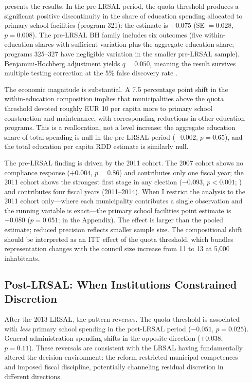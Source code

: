 \documentclass[12pt]{article}
\begin{document}
 presents the results. In the pre-LRSAL period, the quota threshold produces a significant positive discontinuity in the share of education spending allocated to primary school facilities (program 321): the estimate is $+0.075$ (SE $= 0.028$, $p = 0.008$). The pre-LRSAL BH family includes six outcomes (five within-education shares with sufficient variation plus the aggregate education share; programs 325--327 have negligible variation in the smaller pre-LRSAL sample). Benjamini-Hochberg adjustment yields $q = 0.050$, meaning the result survives multiple testing correction at the 5\% false discovery rate \citep{benjamini1995controlling}.



The economic magnitude is substantial. A 7.5 percentage point shift in the within-education composition implies that municipalities above the quota threshold devoted roughly EUR 10 per capita more to primary school construction and maintenance, with corresponding reductions in other education programs. This is a reallocation, not a level increase: the aggregate education share of total spending is null in the pre-LRSAL period ($-0.002$, $p = 0.65$), and the total education per capita RDD estimate is similarly null.

The pre-LRSAL finding is driven by the 2011 cohort. The 2007 cohort shows no compliance response ($+0.004$, $p = 0.86$) and contributes only one fiscal year; the 2011 cohort shows the strongest first stage in any election ($-0.093$, $p < 0.001$; ) and contributes four fiscal years (2011--2014). When I restrict the analysis to the 2011 cohort only---where each municipality contributes a single observation and the running variable is exact---the primary school facilities point estimate is $+0.080$ ($p = 0.051$;  in the Appendix). The effect is larger than the pooled estimate; reduced precision reflects smaller sample size. The compositional shift should be interpreted as an ITT effect of the quota threshold, which bundles representation changes with the council size increase from 11 to 13 at 5,000 inhabitants.


\subsection{Post-LRSAL: When Institutions Constrained Discretion}

After the 2013 LRSAL, the pattern reverses. The quota threshold is associated with \emph{less} primary school spending in the post-LRSAL period ($-0.051$, $p = 0.025$). General administration spending shifts in the opposite direction ($+0.038$, $p = 0.11$). These reversals are consistent with the LRSAL having fundamentally altered the decision environment: the reform restricted municipal competences and imposed fiscal discipline, potentially channeling residual discretion in different directions.
\end{document}
